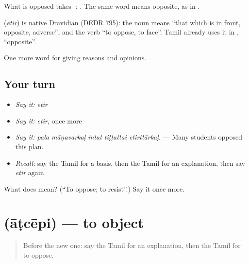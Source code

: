 What is opposed takes -:  . The same word means opposite, as in .

\begin{cousinweb}
\textbf{} (\emph{etir}) is native Dravidian (DEDR 795): the noun means \textquotedblleft{}that which is in front, opposite, adverse\textquotedblright{}, and the verb \textquotedblleft{}to oppose, to face\textquotedblright{}. Tamil already uses it in , \textquotedblleft{}opposite\textquotedblright{}.
\end{cousinweb}

\begin{grammarlens}[title={What you've built}]
One more word for giving reasons and opinions.
\end{grammarlens}

\subsection*{Your turn}
\begin{itemize}
\raggedright
  \item \emph{Say it:} \emph{etir}
  \item \emph{Say it:} \emph{etir}, once more
  \item \emph{Say it:} \emph{pala māṇavarkaḷ intat tiṭṭattai etirttārkaḷ.} — Many students opposed this plan.
  \item \emph{Recall:} say the Tamil for a basis, then the Tamil for an explanation, then say \emph{etir} again
\end{itemize}

\begin{tcolorbox}[breakable,colback=teal!4,colframe=teal!35!black,title={Before you move on}]
What does  mean? (\textquotedblleft{}To oppose; to resist\textquotedblright{}.) Say it once more.
\end{tcolorbox}
\section[\texorpdfstring{\ta{ஆட்சேபி} (āṭcēpi)}{ஆட்சேபி (āṭcēpi)}]{ (āṭcēpi) — to object}

\label{lesson:TA-C348-atcepi}



\begin{quote}
Before the new one: say the Tamil for an explanation, then the Tamil for to oppose.
\end{quote}

